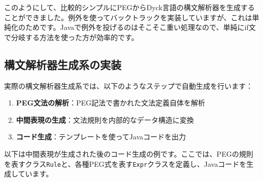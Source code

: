 \begin{Shaded}
\begin{Highlighting}[]
      \NormalTok{() \{}
        \NormalTok{();}
        \NormalTok{()) \{}
             \NormalTok{;  }
\NormalTok{        \} }\NormalTok{ \{}
             \NormalTok{;}
\NormalTok{        \}}
\NormalTok{    \}}
\NormalTok{\}}
\end{Highlighting}
\end{Shaded}

このようにして、比較的シンプルにPEGからDyck言語の構文解析器を生成することができました。例外を使ってバックトラックを実装していますが、これは単純化のためです。Javaで例外を投げるのはそこそこ重い処理なので、単純にif文で分岐する方法を使った方が効率的です。

\hypertarget{chapter6-ux69cbux6587ux89e3ux6790ux5668ux751fux6210ux7cfbux306eux5b9fux88c5}{%
\subsection{構文解析器生成系の実装}\label{chapter6-ux69cbux6587ux89e3ux6790ux5668ux751fux6210ux7cfbux306eux5b9fux88c5}}

実際の構文解析器生成系では、以下のようなステップで自動生成を行います：

\begin{enumerate}
\def\labelenumi{\arabic{enumi}.}
\tightlist
\item
  \textbf{PEG文法の解析}：PEG記法で書かれた文法定義自体を解析
\item
  \textbf{中間表現の生成}：文法規則を内部的なデータ構造に変換
\item
  \textbf{コード生成}：テンプレートを使ってJavaコードを出力
\end{enumerate}

以下は中間表現が生成された後のコード生成の例です。ここでは、PEGの規則を表すクラス\texttt{Rule}と、各種PEG式を表す\texttt{Expr}クラスを定義し、Javaコードを生成しています。

